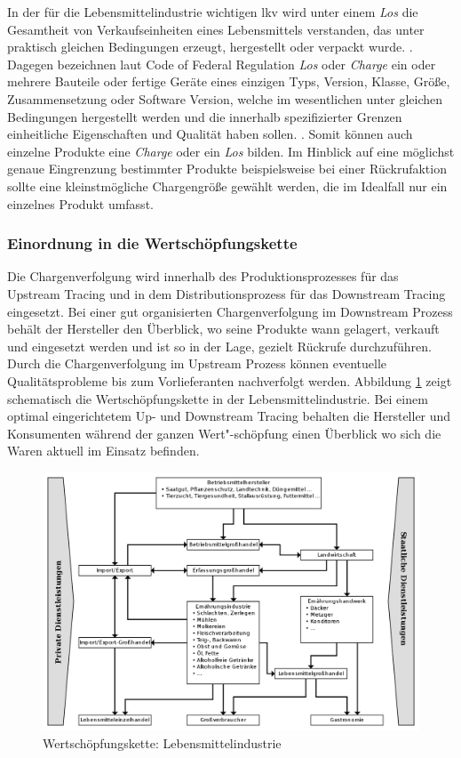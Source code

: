 In der für die Lebensmittelindustrie wichtigen \ac{lkv} wird unter einem \textit{Los} \glqq die Gesamtheit von Verkaufseinheiten eines Lebensmittels verstanden, das unter praktisch gleichen Bedingungen erzeugt, hergestellt oder verpackt wurde.\grqq{} \citep{LKV1993}. Dagegen bezeichnen laut Code of Federal Regulation \textit{Los} oder \textit{Charge} \glqq ein oder mehrere Bauteile oder fertige Geräte eines einzigen Typs, Version, Klasse, Größe, Zusammensetzung oder Software Version, welche im wesentlichen unter gleichen Bedingungen hergestellt werden und die innerhalb spezifizierter Grenzen einheitliche Eigenschaften und Qualität haben sollen.\grqq{} \citep{QSR1996}. Somit können auch einzelne Produkte eine \textit{Charge} oder ein \textit{Los} bilden. Im Hinblick auf eine möglichst genaue Eingrenzung bestimmter Produkte beispielsweise bei einer Rückrufaktion sollte eine kleinstmögliche Chargengröße gewählt werden, die im Idealfall nur ein einzelnes Produkt umfasst.

\subsubsection{Einordnung in die Wertschöpfungskette}

Die Chargenverfolgung wird innerhalb des Produktionsprozesses für das Upstream Tracing und in dem Distributionsprozess für das Downstream Tracing eingesetzt. Bei einer gut organisierten Chargenverfolgung im Downstream Prozess behält der Hersteller den Überblick, wo seine Produkte wann gelagert, verkauft und eingesetzt werden und ist so in der Lage, gezielt Rückrufe durchzuführen. Durch die Chargenverfolgung im Upstream Prozess können eventuelle Qualitätsprobleme bis zum Vorlieferanten nachverfolgt werden. Abbildung \ref{fig:wkd-Lebensmittelindustrie} zeigt schematisch die Wertschöpfungskette in der Lebensmittelindustrie. Bei einem optimal eingerichtetem Up- und Downstream Tracing behalten die Hersteller und Konsumenten während der ganzen Wert"-schöpfung einen Überblick wo sich die Waren aktuell im Einsatz befinden.

\begin{figure}[h!]
	\centering
	\includegraphics[width=1.0\linewidth]{pictures/system-of-agribusiness}
	\caption[Wertschöpfungskette: Lebensmittelindustrie]{Wertschöpfungskette: Lebensmittelindustrie \citep{Strecker2010}}
	\label{fig:wkd-Lebensmittelindustrie}
\end{figure}

